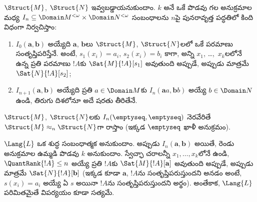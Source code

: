 \documentclass[../../../include/open-logic-section]{subfiles}
\begin{document}
\begin{defn}
   $\Struct{M}$, $\Struct{N}$
  ఇవ్వబడ్డాయనుకుందాం. $k$ అనే ఒకే పొడవు గల అనుక్రమాల మధ్య
  $I_n\subseteq\Domain M^{<\omega}\times\Domain N^{<\omega}$ సంబంధాలను
  $n$పై పునరావృత్త పద్ధతిలో కింది విధంగా నిర్వచిస్తాం:
  \begin{enumerate}
  \item $I_0(\mathbf{a},\mathbf{b})$ అయ్యేది
    $\mathbf{a}$, $\mathbf{b}$లు $\Struct{M}$, $\Struct{N}$లలో ఒకే
    పరమాణు  సంతృప్తిపరిస్తేనే. అంటే,
    $s_1(x_i)=a_i$, $s_2(x_i)=b_i$ కాగా, అన్ని
     $x_1$, \dots,~$x_k$లలోనే ఉన్న ప్రతి
    పరమాణు $!A$కు $\Sat{M}{!A}[s_1]$ అవుతుంది అప్పుడే, అప్పుడు మాత్రమే
    $\Sat{N}{!A}[s_2]$;
  \item $I_{n+1}(\mathbf{a},\mathbf{b})$ అయ్యేది ప్రతి
    $a\in\Domain M$కు $I_n(\mathbf{a}a,\mathbf{b}b)$ అయ్యే
    $b\in\Domain N$ ఉండి, తిరుగు దిశలోనూ అదే షరతు తీరితేనే.
  \end{enumerate}
\end{defn}

\begin{defn}
  $\Struct{M}$, $\Struct{N}$లకు
  $I_n(\emptyseq,\emptyseq)$ నెరవేరితే
  $\Struct{M}\approx_n\Struct{N}$గా రాస్తాం (ఇక్కడ $\emptyseq$ ఖాళీ
  అనుక్రమం).
\end{defn}

\begin{thm}
  $\Lang{L}$ ఒక శుద్ధ సంబంధాత్మక  అనుకుందాం.
  అప్పుడు $I_n(\mathbf{a},\mathbf{b})$ అయితే, రెండు అనుక్రమాల
  ఉమ్మడి పొడవు $k$ అనుకుందాం. స్వేచ్ఛా చరాలన్నీ $x_1,\dots,x_k$లోనే ఉండి,
  $\QuantRank{!A}\le n$ అయ్యే ప్రతి $!A$కు
  $\Sat{M}{!A}[\mathbf{a}]$ అవుతుంది అప్పుడే, అప్పుడు మాత్రమే
  $\Sat{N}{!A}[\mathbf{b}]$ (ఇక్కడ కూడా $\mathbf{a}$, $!A$ను
  సంతృప్తిపరుస్తుందని అనడం అంటే, $s(x_i)=a_i$ అయ్యే ఏ
  $s$ అయినా $!A$ను సంతృప్తిపరుస్తుందని అర్థం).
  అంతేకాక, $\Lang{L}$ పరిమితమైతే
  విపర్యయం కూడా సత్యమే.
\end{thm}
\end{document}

